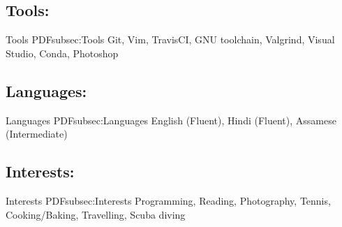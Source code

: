 \documentclass[a4paper,10pt,oneside]{article}
\begin{document}
\begin{body}
\subsection
{Tools:}
{Tools}
{PDFsubsec:Tools}
Git, Vim, TravisCI, GNU toolchain, Valgrind, Visual Studio, Conda, Photoshop
\vspace{15pt}
\subsection
{Languages:}
{Languages}
{PDFsubsec:Languages}
English (Fluent), Hindi (Fluent), Assamese (Intermediate)
\vspace{15pt}
\subsection
{Interests:}
{Interests}
{PDFsubsec:Interests}
Programming, Reading, Photography, Tennis, Cooking/Baking, Travelling, Scuba diving

\vspace{-5pt}
\hline





\end{body}
\end{document}
